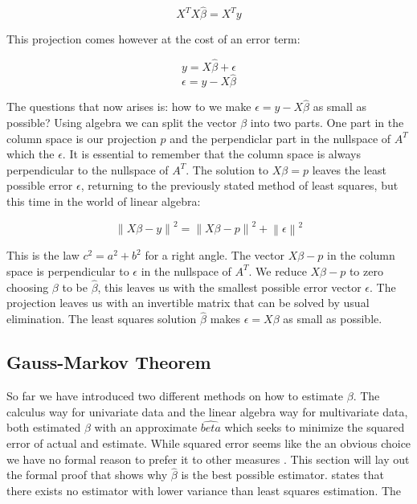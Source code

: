 \documentclass{article}
\begin{document}
    \begin{equation} X^T X \widehat{\beta} = X^T y  \end{equation}

    This projection comes however at the cost of an error term:

    \begin{equation} y = X\widehat{\beta} + \epsilon  \end{equation}
    \begin{equation} \epsilon = y-X\widehat{\beta} \end{equation}

    The questions that now arises is: how to we make $\epsilon = y-X\widehat{\beta}$ as small as possible? Using algebra we can split the vector $\beta$ into two parts. One part in the column space is our projection $p$ and the perpendiclar part in the nullspace of $A^T$ which the $\epsilon$. It is essential to remember that the column space is always perpendicular to the nullspace of $A^T$. The solution to $X\beta = p$ leaves the least possible error $\epsilon$, returning to the previously stated method of least squares, but this time in the world of linear algebra:


     \begin{equation} \left \| X\beta -y \right \|^2 = \left \| X\beta - p \right \|^2 + \left \| \epsilon \right \|^2 \end{equation}

     This is the law $c^2 = a^2 + b^2$ for a right angle. The vector $X\beta-p$ in the column space is perpendicular to $\epsilon$ in the nullspace of $A^T$. We reduce $X\beta-p$ to zero choosing $\beta$ to be $\widehat{\beta}$, this leaves us with the smallest possible error vector $\epsilon$. The projection leaves us with an invertible matrix that can be solved by usual elimination. The least squares solution $\widehat{\beta}$ makes $\epsilon = X\beta$ as small as possible.



    \subsection{Gauss-Markov Theorem}
    So far we have introduced two different methods on how to estimate $\beta$. The calculus way for univariate data and the linear algebra way for multivariate data, both estimated $\beta$ with an approximate $\widehat{beta}$ which seeks to minimize the squared error of actual and estimate. While squared error seems like the an obvious choice we have no formal reason to prefer it to other measures . This section will lay out the formal proof that shows why $\widehat{\beta}$ is the best possible estimator.\cite{gamBook} states that there exists no estimator with lower variance than least squares estimation. The
\end{document}
